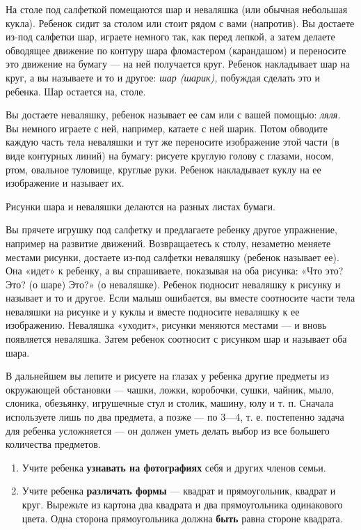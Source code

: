 \documentclass[a5paper]{book}
\renewcommand{\emph}[1]{\textit{#1}}
\begin{document}
На столе под салфеткой помещаются шар и неваляшка (или обычная небольшая
кукла). Ребенок сидит за столом или стоит рядом с вами (напротив). Вы
достаете из-под салфетки шар, играете немного так, как перед лепкой, а
затем делаете обводящее движение по контуру шара фломастером
(карандашом) и переносите это движение на бумагу --- на ней получается
круг. Ребенок накладывает шар на круг, а вы называете и то и другое:
\emph{шар (шарик),} побуждая сделать это и ребенка. Шар остается на,
столе.

Вы достаете неваляшку, ребенок называет ее сам или с вашей помощью:
\emph{ляля.} Вы немного играете с ней, например, катаете с ней шарик.
Потом обводите каждую часть тела неваляшки и тут же переносите
изображение этой части (в виде контурных линий) на бумагу: рисуете
круглую голову с глазами, носом, ртом, овальное туловище, круглые руки.
Ребенок накладывает куклу на ее изображение и называет их.

Рисунки шара и неваляшки делаются на разных листах бумаги.

Вы прячете игрушку под салфетку и предлагаете ребенку другое упражнение,
например на развитие движений. Возвращаетесь к столу, незаметно меняете
местами рисунки, достаете из-под салфетки неваляшку (ребенок называет
ее). Она «идет» к ребенку, а вы спрашиваете, показывая на оба рисунка:
«Что это? Это? (о шаре) Это?» (о неваляшке). Ребенок подносит неваляшку
к рисунку и называет и то и другое. Если малыш ошибается, вы вместе
соотносите части тела неваляшки на рисунке и у куклы и вместе подносите
неваляшку к ее изображению. Неваляшка «уходит», рисунки меняются местами
--- и вновь появляется неваляшка. Затем ребенок соотносит с рисунком шар
и называет оба шара.

В дальнейшем вы лепите и рисуете на глазах у ребенка другие предметы из
окружающей обстановки --- чашки, ложки, коробочки, сушки, чайник, мыло,
слоника, обезьянку, игрушечные стул и столик, машину, юлу и т. п.
Сначала используете лишь по два предмета, а позже --- по 3---4, т. е.
постепенно задача для ребенка усложняется --- он должен уметь делать
выбор из все большего количества предметов.


\begin{enumerate}
\def\labelenumi{\arabic{enumi}.}
\setcounter{enumi}{3}
\item
  
  Учите ребенка \textbf{узнавать на фотографиях} себя и других членов
  семьи.
  
\item
  
  Учите ребенка \textbf{различать формы} --- квадрат и прямоугольник,
  квадрат и круг. Вырежьте из картона два квадрата и два прямоугольника
  одинакового цвета. Одна сторона прямоугольника должна \textbf{быть}
  равна стороне квадрата.
  
\end{enumerate}
\end{document}
